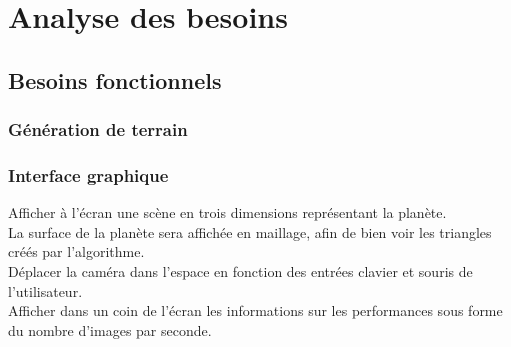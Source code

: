 \documentclass[12pt]{report}
\begin{document}
\chapter*{Analyse des besoins}
\setcounter{chapter}{3}






\section{Besoins fonctionnels}

\subsection{Génération de terrain}


\subsection{Interface graphique}

Afficher à l'écran une scène en trois dimensions représentant la planète.\\
La surface de la planète sera affichée en maillage, afin de bien voir
les triangles créés par l'algorithme.\\
Déplacer la caméra dans l'espace en fonction des entrées clavier et
souris de l'utilisateur.\\
Afficher dans un coin de l'écran les informations sur les performances
sous forme du nombre d'images par seconde.\\
\end{document}
